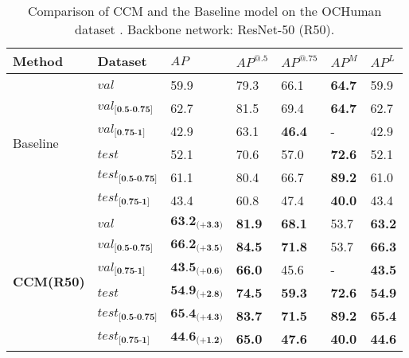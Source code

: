 \documentclass[twocolumn]{svjour3}          \smartqed  \usepackage{natbib}
\begin{document}
\begin{table}[htbp]
\centering
  \caption{Comparison of CCM and the Baseline model on the OCHuman dataset \citep{zhang2019pose}. Backbone network: ResNet-50 (R50).}
\begin{tabular}{p{1.2cm}p{1.3cm}p{1cm}<{\centering}p{0.6cm}<{\centering}p{0.6cm}<{\centering}p{0.5cm}<{\centering}p{0.5cm}<{\centering}}
    \toprule
    Method    & Dataset & $AP$    & $AP^{@.5}$  & $AP^{@.75}$  & $AP^M$   & $AP^L$ \\
    \midrule
    \multirow{6}[0]{*}{Baseline} & $val$   & 59.9  & 79.3  & 66.1  & \textbf{64.7}  & 59.9 \\
          & $val_{\textbf{[0.5-0.75]}}$ & 62.7  & 81.5  & 69.4  & \textbf{64.7}  & 62.7 \\
          & $val_{\textbf{[0.75-1]}}$ & 42.9  & 63.1  & \textbf{46.4}  & -     & 42.9 \\
          \cmidrule{2-7}
          & $test$  & 52.1  & 70.6  & 57.0    & \textbf{72.6}  & 52.1 \\
          & $test_{\textbf{[0.5-0.75]}}$ & 61.1  & 80.4  & 66.7  & \textbf{89.2}  & 61.0 \\
          & $test_{\textbf{[0.75-1]}}$ & 43.4  & 60.8  & 47.4  & \textbf{40.0}    & 43.4 \\
    \midrule
    \midrule
    \multirow{6}[0]{*}{\textbf{CCM(R50)}} & $val$   & $\textbf{63.2}_{\textbf{(+3.3)}}$  & \textbf{81.9}  & \textbf{68.1}  & 53.7  & \textbf{63.2} \\
          & $val_{\textbf{[0.5-0.75]}}$ & $\textbf{66.2}_{\textbf{(+3.5)}}$  & \textbf{84.5}  & \textbf{71.8}  & 53.7  & \textbf{66.3} \\
          & $val_{\textbf{[0.75-1]}}$ & $\textbf{43.5}_{\textbf{(+0.6)}}$  & \textbf{66.0}    & 45.6  & -     & \textbf{43.5} \\
          \cmidrule{2-7}
          & $test$  & $\textbf{54.9}_{\textbf{(+2.8)}}$  & \textbf{74.5}  & \textbf{59.3}  & \textbf{72.6}  & \textbf{54.9} \\
          & $test_{\textbf{[0.5-0.75]}}$ & $\textbf{65.4}_{\textbf{(+4.3)}}$  & \textbf{83.7}  & \textbf{71.5}  & \textbf{89.2}  & \textbf{65.4} \\
          & $test_{\textbf{[0.75-1]}}$ & $\textbf{44.6}_{\textbf{(+1.2)}}$  & \textbf{65.0}    & \textbf{47.6}  & \textbf{40.0}    & \textbf{44.6} \\
    \bottomrule
    \end{tabular}\label{tab:ochuman}\end{table}
\end{document}
